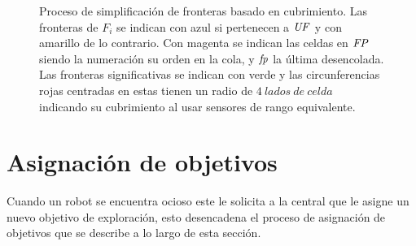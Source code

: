 \begin{figure}[H]
  \centerfloat
  \setcounter{subfigure}{6}

  \caption[Proceso de simplificación de fronteras basado en cubrimiento.]{Proceso
    de simplificación de fronteras basado en cubrimiento. Las fronteras de
    $F_i$ se indican con azul si pertenecen a $\mathit{UF}$ y con amarillo de lo
    contrario. Con magenta se indican las celdas en $\mathit{FP}$ siendo la
    numeración su orden en la cola, y $\mathit{fp}$ la última desencolada. Las fronteras significativas se indican con
    verde y las circunferencias rojas centradas en estas tienen un radio de $4\
  lados\ de\ celda$ indicando su cubrimiento
    al usar sensores de rango equivalente.}\label{fig:ejemploFSCub}
\end{figure}

\section{Asignación de objetivos}\label{sec:asigTar}

Cuando un robot se encuentra ocioso este le solicita a la central que le asigne
un nuevo objetivo de exploración, esto desencadena el proceso de asignación de
objetivos que se describe a lo largo de esta sección.

